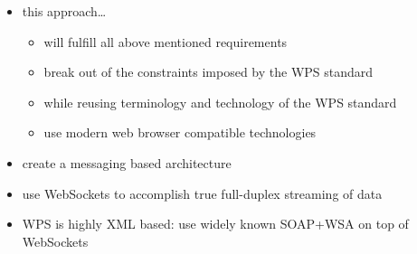 \begin{itemize}
\begin{itemize}
		\end{itemize}
		\item this approach\dots
		\begin{itemize}
			\item will fulfill all above mentioned requirements
			\item break out of the constraints imposed by the WPS standard
			\item while reusing terminology and technology of the WPS standard
			\item use modern web browser compatible technologies
		\end{itemize}
		\item create a messaging based architecture
		\item use WebSockets to accomplish true full-duplex streaming of data
		\item WPS is highly XML based: use widely known SOAP+WSA on top of WebSockets
	\end{itemize}

